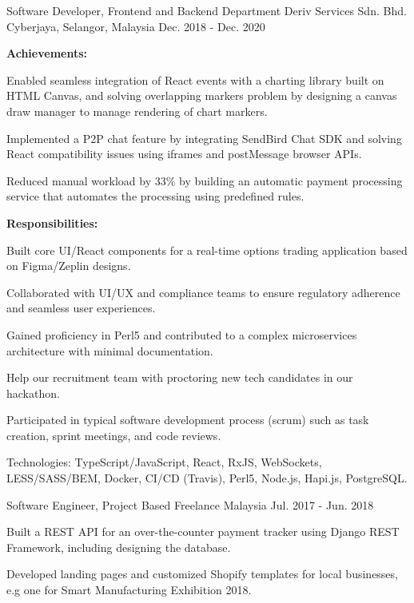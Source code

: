 \begin{cventries}
  \cventry
    {Software Developer, Frontend and Backend Department} %
    {Deriv Services Sdn. Bhd.} %
    {Cyberjaya, Selangor, Malaysia} %
    {Dec. 2018 - Dec. 2020} %
    {
      \textbf{Achievements:}
      \vspace{1.5em}
      \begin{cvitems} %
        \item {Enabled seamless integration of React events with a charting library built on HTML Canvas, and solving overlapping markers problem by designing a canvas draw manager to manage rendering of chart markers.}
        \item {Implemented a P2P chat feature by integrating SendBird Chat SDK and solving React compatibility issues using iframes and postMessage browser APIs.}
        \item {Reduced manual workload by 33\% by building an automatic payment processing service that automates the processing using predefined rules.}
      \end{cvitems}
      \textbf{Responsibilities:}
      \vspace{1.5em}
      \begin{cvitems} %
        \item {Built core UI/React components for a real-time options trading application based on Figma/Zeplin designs.}
        \item {Collaborated with UI/UX and compliance teams to ensure regulatory adherence and seamless user experiences.}
        \item {Gained proficiency in Perl5 and contributed to a complex microservices architecture with minimal documentation.}
        \item {Help our recruitment team with proctoring new tech candidates in our hackathon.}
        \item {Participated in typical software development process (scrum) such as task creation, sprint meetings, and code reviews.}
        \item {Technologies: TypeScript/JavaScript, React, RxJS, WebSockets, LESS/SASS/BEM, Docker, CI/CD (Travis), Perl5, Node.js, Hapi.js, PostgreSQL.}
      \end{cvitems}
    }

  \cventry
    {Software Engineer, Project Based} %
    {Freelance} %
    {Malaysia} %
    {Jul. 2017 - Jun. 2018} %
    {
      \begin{cvitems} %
        \item {Built a REST API for an over-the-counter payment tracker using Django REST Framework, including designing the database.}
        \item {Developed landing pages and customized Shopify templates for local businesses, e.g one for Smart Manufacturing Exhibition 2018.}
      \end{cvitems}
    }

\end{cventries}

